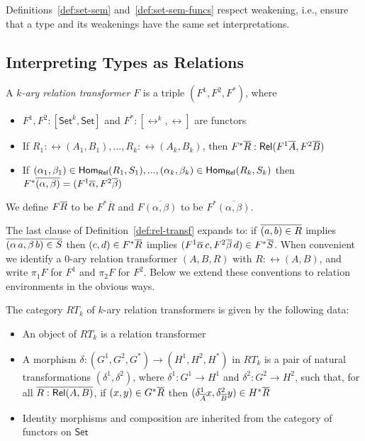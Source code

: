 \documentclass{lmcs}
\theoremstyle{plain}\newtheorem{satz}[thm]{Satz}
\newcommand{\set}{\mathsf{Set}}
\begin{document}
Definitions~\ref{def:set-sem} and~\ref{def:set-sem-funcs} respect
weakening, i.e., ensure that a type and its weakenings have the same
set interpretations.

\subsection{Interpreting Types as Relations}\label{sec:rel-interp}

\begin{defi}\label{def:rel-transf}
A {\em $k$-ary relation transformer} $F$ is a triple $(F^1, F^2,F^*)$,
where
\begin{itemize}
\item $F^1,F^2 : [\set^k,\set]$ and $F^* : [\rel^k, \rel]$ are
  functors
\item If $R_1:\rel(A_1,B_1),...,R_k:\rel(A_k,B_k)$, then $F^* \overline{R} :
  \mathsf{Rel}(F^1 \overline{A}, F^2 \overline{B})$
\item If $(\alpha_1, \beta_1) \in \mathsf{Hom_{Rel}}(R_1,S_1),..., (\alpha_k,
  \beta_k) \in \mathsf{Hom_{Rel}}(R_k,S_k)$ then $F^* \overline{(\alpha, \beta)} = (F^1
  \overline{\alpha}, F^2 \overline{\beta})$
\end{itemize}
We define $F\overline{R}$ to be $F^*\overline{R}$ and
$F\overline{(\alpha,\beta)}$ to be $F^*\overline{(\alpha,\beta)}$.
\end{defi}
The last clause of Definition~\ref{def:rel-transf} expands to: if
$\overline{(a,b) \in R}$ implies $\overline{(\alpha\,a,\beta\,b) \in S}$ then
$(c,d) \in F^*\overline{R}$ implies $(F^1 \overline{\alpha}\,c,F^2 \overline{\beta}\,d)
\in F^*\overline{S}$. When convenient we identify a $0$-ary relation
transformer $(A,B,R)$ with $R : \rel(A,B)$, and write $\pi_1 F$ for
$F^1$ and $\pi_2 F$ for $F^2$. Below we extend these conventions to
relation environments in the obvious ways.

\begin{defi}
The category $RT_k$ of $k$-ary relation transformers is given by the
following data:
\begin{itemize}
\item An object of $RT_k$ is a relation transformer
\item A morphism $\delta : (G^1,G^2,G^*) \to (H^1,H^2,H^*)$ in $RT_k$
  is a pair of natural transformations $(\delta^1, \delta^2)$, where
  $\delta^1 : G^1 \to H^1$ and $\delta^2 : G^2 \to H^2$, such that,
  for all $\overline{R : \mathsf{Rel}(A, B)}$, if $(x, y) \in G^*\overline{R}$ then
  $(\delta^1_{\overline{A}}x, \delta^2_{\overline{B}}y) \in H^*\overline{R}$
\item Identity morphisms and composition are inherited from the
  category of functors on $\set$
\end{itemize}
\end{defi}
\end{document}
